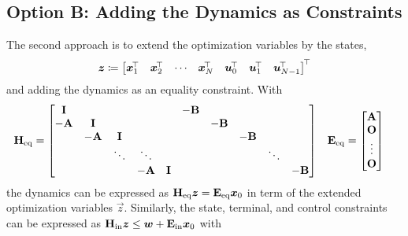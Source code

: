 		\subsection{Option B: Adding the Dynamics as Constraints}
			The second approach is to extend the optimization variables by the states,
			\begin{equation}
				\bm{z} \coloneqq \begin{bmatrix} \bm{x}_1^{\!\top} & \bm{x}_2^{\!\top} & \cdots & \bm{x}_N^{\!\top} & \bm{u}_0^{\!\top} & \bm{u}_1^{\!\top} & \bm{u}_{N - 1}^{\!\top} \end{bmatrix}^{\!\top}
			\end{equation}
			and adding the dynamics as an equality constraint. With
			\begin{align}
				\bm{\mathrm{H}}_\mathrm{eq}                                                                                        & =
				\begin{bmatrix}
					\bm{\mathrm{I}}  &          &         &          &         & -\bm{\mathrm{B}} &          &          &        &          \\
					-\bm{\mathrm{A}} & \bm{\mathrm{I}}  &         &          &         &          & -\bm{\mathrm{B}} &          &        &          \\
					         & -\bm{\mathrm{A}} & \bm{\mathrm{I}} &          &         &          &          & -\bm{\mathrm{B}} &        &          \\
					         &          & \ddots  & \ddots   &         &          &          &          & \ddots &          \\
					         &          &         & -\bm{\mathrm{A}} & \bm{\mathrm{I}} &          &          &          &        & -\bm{\mathrm{B}}
				\end{bmatrix} &
				\bm{\mathrm{E}}_\mathrm{eq}                                                                                        & =
				\begin{bmatrix}
					\bm{\mathrm{A}} \\
					\bm{\mathrm{O}} \\
					\vdots  \\
					\bm{\mathrm{O}}
				\end{bmatrix}
			\end{align}
			the dynamics can be expressed as \( \bm{\mathrm{H}}_\mathrm{eq} \bm{z} = \bm{\mathrm{E}}_\mathrm{eq} \bm{x}_0 \) in term of the extended optimization variables \(\vec{z}\). Similarly, the state, terminal, and control constraints can be expressed as \( \bm{\mathrm{H}}_\mathrm{in} \bm{z} \leq \bm{w} + \bm{\mathrm{E}}_\mathrm{in} \bm{x}_0 \) with
